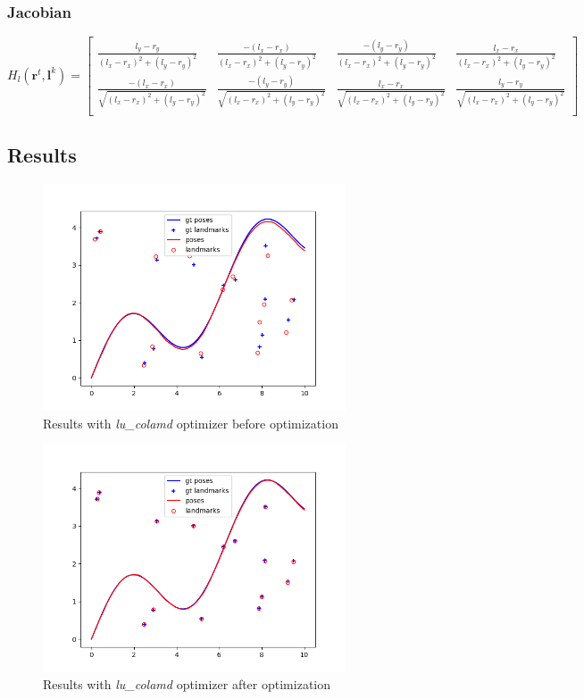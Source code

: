 \documentclass[12pt, a4paper]{article}
\begin{document}
\subsubsection{Jacobian}
\[H_l(\mathbf{r}^t, \mathbf{l}^{k}) = \begin{bmatrix}
  \frac{l_y - r_y}{(l_x - r_x)^2 + (l_y - r_y)^2} & \frac{-(l_x - r_x)}{(l_x - r_x)^2 + (l_y - r_y)^2} & \frac{-(l_y - r_y)}{(l_x - r_x)^2 + (l_y - r_y)^2} & \frac{l_x - r_x}{(l_x - r_x)^2 + (l_y - r_y)^2}\\
  \frac{-(l_x - r_x)}{\sqrt{(l_x - r_x)^2 + (l_y - r_y)^2}} & \frac{-(l_y - r_y)}{\sqrt{(l_x - r_x)^2 + (l_y - r_y)^2}} & \frac{l_x - r_x}{\sqrt{(l_x - r_x)^2 + (l_y - r_y)^2}} & \frac{l_y - r_y}{\sqrt{(l_x - r_x)^2 + (l_y - r_y)^2}}\\
\end{bmatrix}\]

\subsection{Results}
\begin{figure}[H]
  \centering
  \includegraphics[width=0.8\textwidth]{./results/nonlinear/lu_colamd_2d_nonlinear_map_before.png}
  \caption{Results with \textit{lu\_colamd} optimizer before optimization}
\end{figure}
\begin{figure}[H]
  \centering
  \includegraphics[width=0.8\textwidth]{./results/nonlinear/lu_colamd_2d_nonlinear_map_after.png}
  \caption{Results with \textit{lu\_colamd} optimizer after optimization}
\end{figure}
\end{document}
